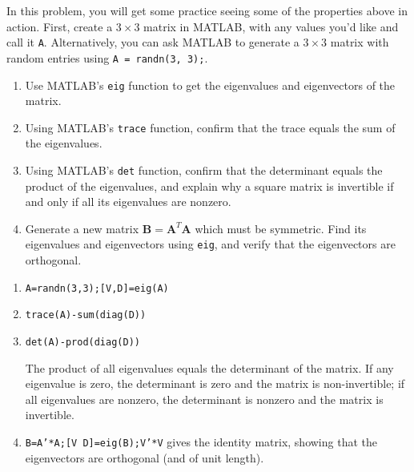 \begin{prob}
In this problem, you will get some practice seeing some of the properties above in action. First, create a $3\times 3$ matrix in MATLAB, with any values you'd like and call it \texttt{A}. Alternatively, you can ask MATLAB to generate a $3\times 3$ matrix with random entries using \texttt{A = randn(3, 3);}.

    \begin{enumerate}
    \item Use MATLAB's \texttt{eig} function to get the eigenvalues and eigenvectors of the matrix.
    \item Using MATLAB's \texttt{trace} function, confirm that the trace equals the sum of the eigenvalues.
    \item Using MATLAB's \texttt{det} function, confirm that the determinant equals the product of the eigenvalues, and explain why a square matrix is invertible if and only if all its eigenvalues are nonzero.
    \item Generate a new matrix $\mathbf{B} = \mathbf{A}^T\mathbf{A}$ which must be symmetric. Find its eigenvalues and eigenvectors using \texttt{eig}, and verify that the eigenvectors are orthogonal.
    \end{enumerate}
\end{prob}
\begin{sol}
\begin{enumerate}
    \item \texttt{A=randn(3,3);[V,D]=eig(A)}
    \item \texttt{trace(A)-sum(diag(D))}
    \item \texttt{det(A)-prod(diag(D))} 

The product of all eigenvalues equals the determinant of the matrix. If any eigenvalue is zero, the determinant is zero and the matrix is non-invertible; if all eigenvalues are nonzero, the determinant is nonzero and the matrix is invertible.
\item  \texttt{B=A'*A;[V D]=eig(B);V'*V} gives the identity matrix, showing that the eigenvectors are orthogonal (and of unit length).
\end{enumerate}
\end{sol}


